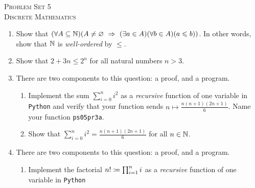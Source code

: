 




\begin{center}
    \textsc{\huge Problem Set 5}\\
    \textsc{Discrete Mathematics}\\
\end{center}

\begin{enumerate}
    \item
        Show that $\pn*{\forall A \subseteq \N}
                        \pn*{A \neq \emptyset \implies \pn*{\exists a \in A}\pn*{\forall b \in A}\pn*{a \leq b}}$.
        In other words, show that $\mathbb{N}$ is \emph{well-ordered} by $\leq$.
    \item
        Show that $2 + 3n \leq 2^n$ for all natural numbers $n > 3$.
    \item
        There are two components to this question: a proof, and a program.
        \begin{enumerate}
            \item
                Implement the sum $\sum_{i = 0}^{n}i^2$
                as a \emph{recursive} function of one variable in \texttt{Python}
                and verify that your function sends $n \mapsto \frac{n(n + 1)(2n + 1)}{6}$.
                Name your function \texttt{ps05pr3a}.
            \item
                Show that $\displaystyle \sum_{i = 0}^{n}i^2 = \frac{n(n + 1)(2n + 1)}{6}$
                for all $n \in \mathbb{N}$.
        \end{enumerate}
    \item
        There are two components to this question: a proof, and a program.
        \begin{enumerate}
            \item
                Implement the factorial $n! \coloneqq \prod_{i = 1}^{n}i$
                as a \emph{recursive} function of one variable in \texttt{Python}

\end{enumerate}
\end{enumerate}
